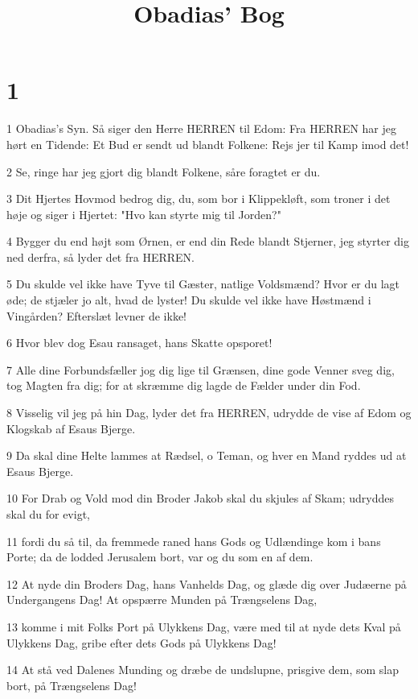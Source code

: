 

\title{Obadias' Bog}


\chapter{1}

\par 1 Obadias's Syn. Så siger den Herre HERREN til Edom: Fra HERREN har jeg hørt en Tidende: Et Bud er sendt ud blandt Folkene: Rejs jer til Kamp imod det!
\par 2 Se, ringe har jeg gjort dig blandt Folkene, såre foragtet er du.
\par 3 Dit Hjertes Hovmod bedrog dig, du, som bor i Klippekløft, som troner i det høje og siger i Hjertet: "Hvo kan styrte mig til Jorden?"
\par 4 Bygger du end højt som Ørnen, er end din Rede blandt Stjerner, jeg styrter dig ned derfra, så lyder det fra HERREN.
\par 5 Du skulde vel ikke have Tyve til Gæster, natlige Voldsmænd? Hvor er du lagt øde; de stjæler jo alt, hvad de lyster! Du skulde vel ikke have Høstmænd i Vingården? Efterslæt levner de ikke!
\par 6 Hvor blev dog Esau ransaget, hans Skatte opsporet!
\par 7 Alle dine Forbundsfæller jog dig lige til Grænsen, dine gode Venner sveg dig, tog Magten fra dig; for at skræmme dig lagde de Fælder under din Fod.
\par 8 Visselig vil jeg på hin Dag, lyder det fra HERREN, udrydde de vise af Edom og Klogskab af Esaus Bjerge.
\par 9 Da skal dine Helte lammes at Rædsel, o Teman, og hver en Mand ryddes ud at Esaus Bjerge.
\par 10 For Drab og Vold mod din Broder Jakob skal du skjules af Skam; udryddes skal du for evigt,
\par 11 fordi du så til, da fremmede raned hans Gods og Udlændinge kom i bans Porte; da de lodded Jerusalem bort, var og du som en af dem.
\par 12 At nyde din Broders Dag, hans Vanhelds Dag, og glæde dig over Judæerne på Undergangens Dag! At opspærre Munden på Trængselens Dag,
\par 13 komme i mit Folks Port på Ulykkens Dag, være med til at nyde dets Kval på Ulykkens Dag, gribe efter dets Gods på Ulykkens Dag!
\par 14 At stå ved Dalenes Munding og dræbe de undslupne, prisgive dem, som slap bort, på Trængselens Dag!
